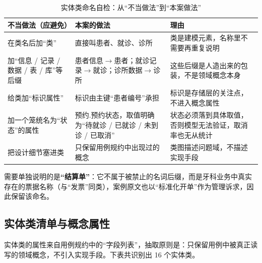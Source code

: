 \documentclass[11pt,a4paper]{ctexart}
\begin{document}
\begin{table}[H]
\centering
\caption{实体类命名自检：从“不当做法”到“本案做法”}
\begin{tabularx}{\linewidth}{@{}L{4.3cm}L{4.3cm}X@{}}
\toprule
\textbf{\textcolor{adcblue!92}{不当做法（应避免）}} & \textbf{\textcolor{adcblue!92}{本案的做法}} & \textbf{\textcolor{adcblue!92}{理由}} \\
\midrule
在类名后加“类” & 直接叫患者、就诊、诊所 & 类是建模元素，名称里不需要再重复说明 \\
加“信息 / 记录 / 数据 / 表 / 库”等后缀 & 患者信息$\rightarrow$患者；就诊记录$\rightarrow$就诊；诊所数据$\rightarrow$诊所 & 这些后缀是人造出来的包装，不是领域概念本身 \\
给类加“标识属性” & 标识由主键“患者编号”承担 & 标识是存储层的关注点，不进入概念属性 \\
加一个笼统名为“状态”的属性 & 预约.预约状态，取值明确为“待就诊 / 已就诊 / 未到诊 / 已取消” & 状态必须落到具体取值，否则模型无法验证，取消率也无从统计 \\
把设计细节塞进类 & 只保留用例规约中出现过的概念 & 类图描述问题域，不描述实现手段 \\
\bottomrule
\end{tabularx}
\end{table}

需要单独说明的是\textbf{“结算单”}：它不属于被禁止的名词后缀，而是牙科业务中真实存在的票据名称（与“发票”同类），案例原文也以“标准化开单”作为管理诉求，因此保留该命名。
\subsection{实体类清单与概念属性}

实体类的属性来自用例规约中的“字段列表”，抽取原则是：只保留用例中被真正读写的领域概念，不引入实现手段。下表共识别出 16 个实体类。
\end{document}
